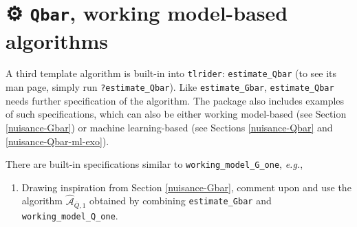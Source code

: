 \documentclass[
  11pt,
  openright,twoside]{book}
\newenvironment{Shaded}{\begin{snugshade}}{\end{snugshade}}
\newcommand{\CommentTok}[1]{\textcolor[rgb]{0.56,0.35,0.01}{\textit{#1}}}
\newcommand{\NormalTok}[1]{#1}
\providecommand{\tightlist}{%
  \setlength{\itemsep}{0pt}\setlength{\parskip}{0pt}}
\newcommand{\gear}{\usebox{\gearbox}\;}
\newcommand{\Algo}{\widehat{\mathcal{A}}}
\newcommand{\Qbar}{\bar{Q}}
\theoremstyle{definition}
\theoremstyle{definition}
\theoremstyle{definition}
\theoremstyle{definition}
\theoremstyle{remark}
\begin{document}
\hypertarget{nuisance-Qbar-wm}{%
\section{\texorpdfstring{⚙ \gear \texttt{Qbar}, working model-based algorithms}{⚙ Qbar, working model-based algorithms}}\label{nuisance-Qbar-wm}}

A third template algorithm is built-in into \texttt{tlrider}: \texttt{estimate\_Qbar} (to see
its man page, simply run \texttt{?estimate\_Qbar}). Like \texttt{estimate\_Gbar},
\texttt{estimate\_Qbar} needs further specification of the algorithm. The package also
includes examples of such specifications, which can also be either working
model-based (see Section \ref{nuisance-Gbar}) or machine learning-based (see
Sections \ref{nuisance-Qbar} and \ref{nuisance-Qbar-ml-exo}).

There are built-in specifications similar to \texttt{working\_model\_G\_one}, \emph{e.g.},

\begin{Shaded}
\end{Shaded}

\begin{enumerate}
\def\labelenumi{\arabic{enumi}.}
\tightlist
\item
  Drawing inspiration from Section \ref{nuisance-Gbar}, comment upon and use
  the algorithm \(\Algo_{\Qbar,1}\) obtained by combining \texttt{estimate\_Gbar} and
  \texttt{working\_model\_Q\_one}.
\end{enumerate}
\end{document}
